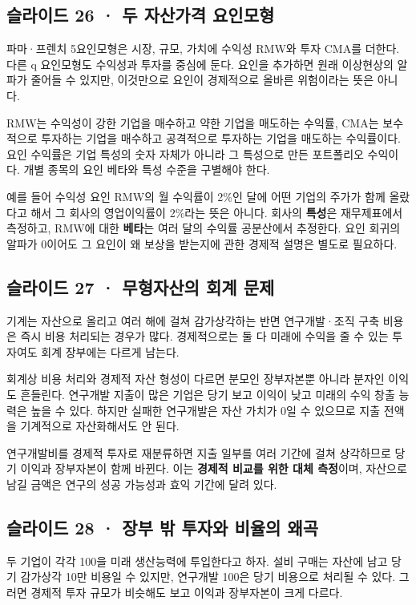 \documentclass[11pt,a4paper]{article}
\begin{document}
\subsection{슬라이드 26 · 두 자산가격 요인모형}
파마·프렌치 5요인모형은 시장, 규모, 가치에 수익성 RMW와 투자 CMA를 더한다. 다른 q 요인모형도 수익성과 투자를 중심에 둔다. 요인을 추가하면 원래 이상현상의 알파가 줄어들 수 있지만, 이것만으로 요인이 경제적으로 올바른 위험이라는 뜻은 아니다.\par

RMW는 수익성이 강한 기업을 매수하고 약한 기업을 매도하는 수익률, CMA는 보수적으로 투자하는 기업을 매수하고 공격적으로 투자하는 기업을 매도하는 수익률이다. 요인 수익률은 기업 특성의 숫자 자체가 아니라 그 특성으로 만든 포트폴리오 수익이다. 개별 종목의 요인 베타와 특성 수준을 구별해야 한다.\par

예를 들어 수익성 요인 RMW의 월 수익률이 2\%인 달에 어떤 기업의 주가가 함께 올랐다고 해서 그 회사의 영업이익률이 2\%라는 뜻은 아니다. 회사의 \textbf{특성}은 재무제표에서 측정하고, RMW에 대한 \textbf{베타}는 여러 달의 수익률 공분산에서 추정한다. 요인 회귀의 알파가 0이어도 그 요인이 왜 보상을 받는지에 관한 경제적 설명은 별도로 필요하다.\par

\subsection{슬라이드 27 · 무형자산의 회계 문제}
기계는 자산으로 올리고 여러 해에 걸쳐 감가상각하는 반면 연구개발·조직 구축 비용은 즉시 비용 처리되는 경우가 많다. 경제적으로는 둘 다 미래에 수익을 줄 수 있는 투자여도 회계 장부에는 다르게 남는다.\par

회계상 비용 처리와 경제적 자산 형성이 다르면 분모인 장부자본뿐 아니라 분자인 이익도 흔들린다. 연구개발 지출이 많은 기업은 당기 보고 이익이 낮고 미래의 수익 창출 능력은 높을 수 있다. 하지만 실패한 연구개발은 자산 가치가 0일 수 있으므로 지출 전액을 기계적으로 자산화해서도 안 된다.\par

연구개발비를 경제적 투자로 재분류하면 지출 일부를 여러 기간에 걸쳐 상각하므로 당기 이익과 장부자본이 함께 바뀐다. 이는 \textbf{경제적 비교를 위한 대체 측정}이며, 자산으로 남길 금액은 연구의 성공 가능성과 효익 기간에 달려 있다.\par

\subsection{슬라이드 28 · 장부 밖 투자와 비율의 왜곡}
두 기업이 각각 100을 미래 생산능력에 투입한다고 하자. 설비 구매는 자산에 남고 당기 감가상각 10만 비용일 수 있지만, 연구개발 100은 당기 비용으로 처리될 수 있다. 그러면 경제적 투자 규모가 비슷해도 보고 이익과 장부자본이 크게 다르다.\par
\end{document}
